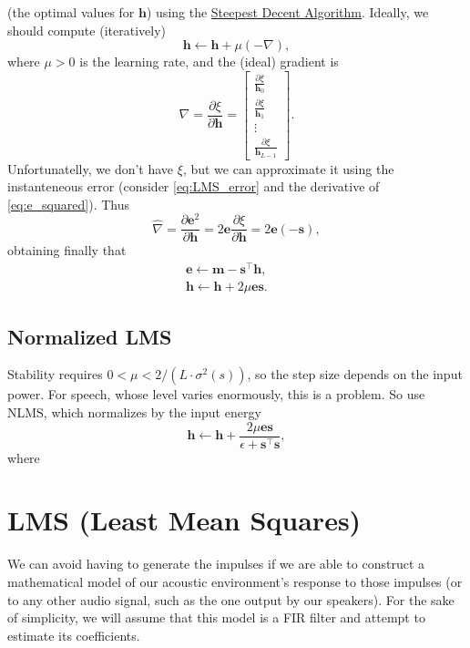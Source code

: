 (the optimal values for $\mathbf{h}$) using the
\href{https://en.wikipedia.org/wiki/Method_of_steepest_descent}{Steepest
  Decent Algorithm}. Ideally, we should compute (iteratively)
\begin{equation}
  \mathbf{h}\leftarrow\mathbf{h}+\mu(-\nabla),
\end{equation}
where $\mu>0$ is the learning rate, and the (ideal) gradient is
\begin{equation}
  \nabla = \frac{\partial\xi}{\partial\mathbf{h}} =
  \begin{bmatrix}
    \frac{\partial\xi}{\mathbf{h}_0} \\
    \frac{\partial\xi}{\mathbf{h}_1} \\
    \vdots \\
    \frac{\partial\xi}{\mathbf{h}_{L-1}}
  \end{bmatrix}.
\end{equation}
Unfortunatelly, we don't have $\xi$, but we can approximate it using
the instanteneous error (consider \eqref{eq:LMS_error} and the derivative of \eqref{eq:e_squared}). Thus
\begin{equation}
  \hat{\nabla} = \frac{\partial\mathbf{e}^2}{\partial\mathbf{h}} = 2\mathbf{e}\frac{\partial\xi}{\partial\mathbf{h}} = 2\mathbf{e}(-\mathbf{s}),
\end{equation}
obtaining finally that
\begin{eqnarray}
  \mathbf{e} \leftarrow \mathbf{m} - \mathbf{s}^\top\mathbf{h}, && \\
  \mathbf{h} \leftarrow \mathbf{h} + 2\mu\mathbf{e}\mathbf{s}. &&
\end{eqnarray}

\subsection{Normalized LMS}
Stability requires $0 < \mu < 2/(L · \sigma^2(s))$, so the step size
depends on the input power. For speech, whose level varies enormously,
this is a problem. So use NLMS, which normalizes by the input energy
\begin{equation}
  \mathbf{h} \leftarrow \mathbf{h} + \frac{2\mu\mathbf{e}\mathbf{s}}{\epsilon+\mathbf{s}^\top\mathbf{s}},
\end{equation}
where \section{LMS (Least Mean Squares)}

We can avoid having to generate the impulses if we are able to
construct a mathematical model of our acoustic environment's response
to those impulses (or to any other audio signal, such as the one output
by our speakers). For the sake of simplicity, we will assume that this
model is a FIR filter and attempt to estimate its coefficients.

